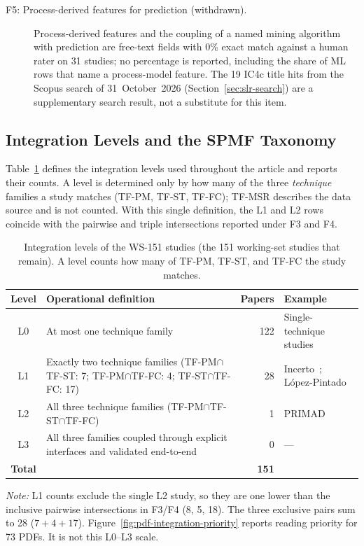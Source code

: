 \begin{description}
\item[F5: Process-derived features for prediction (withdrawn).]
Process-derived features and the coupling of a named mining algorithm with
prediction are free-text fields with 0\% exact match against a human rater
on 31 studies; no percentage is reported, including the share of ML rows
that name a process-model feature. The 19 IC4c title hits from the Scopus
search of 31~October~2026 (Section~\ref{sec:slr-search}) are a
supplementary search result, not a substitute for this item.

\end{description}

\subsection{Integration Levels and the SPMF Taxonomy}
\label{sec:slr-positioning}

Table~\ref{tab:positioning} defines the integration levels used throughout
the article and reports their counts. A level is determined only by how many
of the three \emph{technique} families a study matches (TF-PM, TF-ST,
TF-FC); TF-MSR describes the data source and is not counted. With this
single definition, the L1 and L2 rows coincide with the pairwise and triple
intersections reported under F3 and F4.

\begin{table}[htbp]
\centering
\caption{Integration levels of the WS-151 studies (the 151 working-set
studies that remain). A level counts
how many of TF-PM, TF-ST, and TF-FC the study matches.}
\label{tab:positioning}
\small
\begin{tabularx}{\linewidth}{@{}c X r X@{}}
\toprule
\textbf{Level} & \textbf{Operational definition} & \textbf{Papers} & \textbf{Example} \\
\midrule
L0 & At most one technique family & 122 & Single-technique studies \\
L1 & Exactly two technique families (TF-PM$\cap$TF-ST: 7;
     TF-PM$\cap$TF-FC: 4; TF-ST$\cap$TF-FC: 17) & 28
   & Incerto~\cite{incerto2025}; L\'opez-Pintado~\cite{lopezpintado2023} \\
L2 & All three technique families (TF-PM$\cap$TF-ST$\cap$TF-FC) & 1
   & PRIMAD~\cite{guinea2025} \\
L3 & All three families coupled through explicit interfaces and validated
     end-to-end & 0 & --- \\
\midrule
\textbf{Total} & & \textbf{151} & \\
\bottomrule
\end{tabularx}

\smallskip
\footnotesize\textit{Note:} L1 counts exclude the single L2 study, so they are
one lower than the inclusive pairwise intersections in F3/F4 (8, 5, 18).
The three exclusive pairs sum to 28 ($7+4+17$).
Figure~\ref{fig:pdf-integration-priority} reports reading priority for 73
PDFs. It is not this L0--L3 scale.
\end{table}

